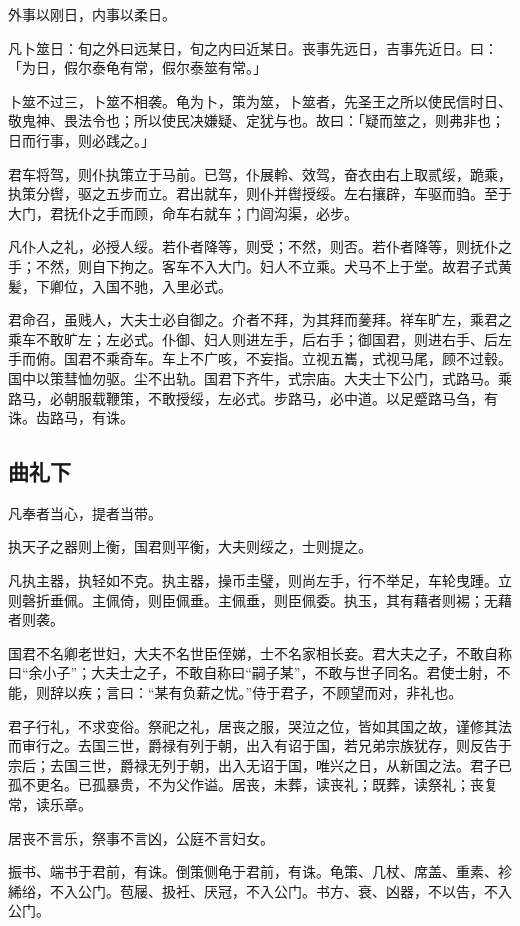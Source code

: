 \documentclass[]{article}
\begin{document}
外事以刚日，内事以柔日。

凡卜筮日：旬之外曰远某日，旬之内曰近某日。丧事先远日，吉事先近日。曰：「为日，假尔泰龟有常，假尔泰筮有常。」

卜筮不过三，卜筮不相袭。龟为卜，策为筮，卜筮者，先圣王之所以使民信时日、敬鬼神、畏法令也；所以使民决嫌疑、定犹与也。故曰：「疑而筮之，则弗非也；日而行事，则必践之。」

君车将驾，则仆执策立于马前。已驾，仆展軨、效驾，奋衣由右上取贰绥，跪乘，执策分辔，驱之五步而立。君出就车，则仆并辔授绥。左右攘辟，车驱而驺。至于大门，君抚仆之手而顾，命车右就车；门闾沟渠，必步。

凡仆人之礼，必授人绥。若仆者降等，则受；不然，则否。若仆者降等，则抚仆之手；不然，则自下拘之。客车不入大门。妇人不立乘。犬马不上于堂。故君子式黄髪，下卿位，入国不驰，入里必式。

君命召，虽贱人，大夫士必自御之。介者不拜，为其拜而蓌拜。祥车旷左，乘君之乘车不敢旷左；左必式。仆御、妇人则进左手，后右手；御国君，则进右手、后左手而俯。国君不乘奇车。车上不广咳，不妄指。立视五巂，式视马尾，顾不过毂。国中以策彗恤勿驱。尘不出轨。国君下齐牛，式宗庙。大夫士下公门，式路马。乘路马，必朝服载鞭策，不敢授绥，左必式。步路马，必中道。以足蹙路马刍，有诛。齿路马，有诛。

\hypertarget{header-n74}{%
\subsection{曲礼下}\label{header-n74}}

凡奉者当心，提者当带。

执天子之器则上衡，国君则平衡，大夫则绥之，士则提之。

凡执主器，执轻如不克。执主器，操币圭璧，则尚左手，行不举足，车轮曳踵。立则磬折垂佩。主佩倚，则臣佩垂。主佩垂，则臣佩委。执玉，其有藉者则裼；无藉者则袭。

国君不名卿老世妇，大夫不名世臣侄娣，士不名家相长妾。君大夫之子，不敢自称曰``余小子''；大夫士之子，不敢自称曰``嗣子某''，不敢与世子同名。君使士射，不能，则辞以疾；言曰：``某有负薪之忧。''侍于君子，不顾望而对，非礼也。

君子行礼，不求变俗。祭祀之礼，居丧之服，哭泣之位，皆如其国之故，谨修其法而审行之。去国三世，爵禄有列于朝，出入有诏于国，若兄弟宗族犹存，则反告于宗后；去国三世，爵禄无列于朝，出入无诏于国，唯兴之日，从新国之法。君子已孤不更名。已孤暴贵，不为父作谥。居丧，未葬，读丧礼；既葬，读祭礼；丧复常，读乐章。

居丧不言乐，祭事不言凶，公庭不言妇女。

振书、端书于君前，有诛。倒策侧龟于君前，有诛。龟策、几杖、席盖、重素、袗絺绤，不入公门。苞屦、扱衽、厌冠，不入公门。书方、衰、凶器，不以告，不入公门。
\end{document}
